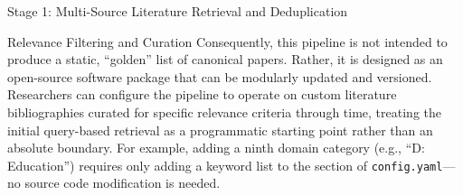 \documentclass[
  ignorenonframetext,
]{beamer}
\begin{document}
\begin{frame}{Stage 1: Multi-Source Literature
Retrieval and Deduplication \label{sec:methods_retrieval}}
\begin{block}{Relevance Filtering and Curation}
Consequently, this pipeline is not intended to produce a static,
``golden'' list of canonical papers. Rather, it is designed as an
open-source software package that can be modularly updated and
versioned. Researchers can configure the pipeline to operate on custom
literature bibliographies curated for specific relevance criteria
through time, treating the initial query-based retrieval as a
programmatic starting point rather than an absolute boundary. For
example, adding a ninth domain category (e.g., ``D: Education'')
requires only adding a keyword list to the 
section of \texttt{config.yaml}---no source code modification is needed.
\end{block}
\end{frame}
\end{document}
